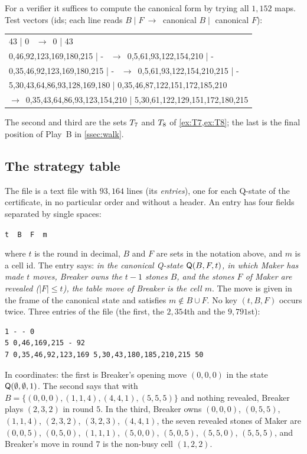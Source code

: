 For a verifier it suffices to compute the canonical form by trying all $1{,}152$ maps. Test vectors (ids;
each line reads $B\mid F\ \to\ $ canonical $B\mid$ canonical $F$):
\begin{center}\small\ttfamily
\begin{tabular}{@{}l@{}}
43 | 0 \ $\to$\ 0 | 43\\
0,46,92,123,169,180,215 | - \ $\to$\ 0,5,61,93,122,154,210 | -\\
0,35,46,92,123,169,180,215 | - \ $\to$\ 0,5,61,93,122,154,210,215 | -\\
5,30,43,64,86,93,128,169,180 | 0,35,46,87,122,151,172,185,210\\
\qquad$\to$\ 0,35,43,64,86,93,123,154,210 | 5,30,61,122,129,151,172,180,215
\end{tabular}
\end{center}
The second and third are the sets $T_7$ and $T_8$ of \cref{ex:T7,ex:T8}; the last is the final
position of Play~B in \cref{ssec:walk}.

\subsection{The strategy table}\label{ssec:fmt-table}

The file  is a text file with $93{,}164$ lines (its \emph{entries}), one
for each Q-state of the
certificate, in no particular order and without a header. An entry has four fields separated by single
spaces:
\begin{center}
\texttt{t\ \ B\ \ F\ \ m}
\end{center}
where $t$ is the round in decimal, $B$ and $F$ are sets in the notation above, and $m$ is a cell id. The
entry says: \emph{in the canonical Q-state $\mathsf{Q}(B,F,t)$, in which Maker has made $t$ moves, Breaker owns the
$t-1$ stones $B$, and the stones $F$ of Maker are revealed ($|F|\le t$), the table move of Breaker is the
cell $m$}.
The move is given in the frame of the canonical state and satisfies $m\notin B\cup F$. No key $(t,B,F)$
occurs twice. Three entries of the file (the first, the $2{,}354$th and the $9{,}791$st):
\begin{verbatim}
1 - - 0
5 0,46,169,215 - 92
7 0,35,46,92,123,169 5,30,43,180,185,210,215 50
\end{verbatim}
In coordinates: the first is Breaker's opening move $(0,0,0)$ in the state $\mathsf{Q}(\emptyset,\emptyset,1)$.
The second says that with $B=\{(0,0,0),(1,1,4),(4,4,1),(5,5,5)\}$ and nothing revealed, Breaker plays
$(2,3,2)$ in round $5$. In the third, Breaker owns $(0,0,0)$, $(0,5,5)$, $(1,1,4)$, $(2,3,2)$, $(3,2,3)$,
$(4,4,1)$, the seven revealed stones of Maker are $(0,0,5)$, $(0,5,0)$, $(1,1,1)$, $(5,0,0)$, $(5,0,5)$,
$(5,5,0)$, $(5,5,5)$, and Breaker's move in round $7$ is the non-busy cell $(1,2,2)$.

